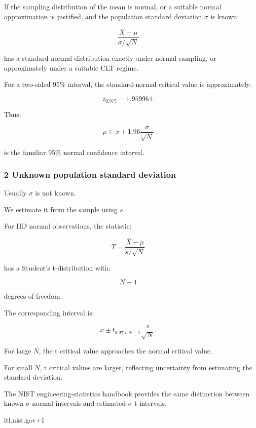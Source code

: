 \hypertarget{02-foundations-ii-ch030-known-population-standard-deviation}{}

If the sampling distribution of the mean is normal, or a suitable normal approximation is justified, and the population standard deviation \(\sigma\) is known:

\[
 \frac{\bar X-\mu}{\sigma/\sqrt N}
\]

has a standard-normal distribution exactly under normal sampling, or approximately under a suitable CLT regime.

For a two-sided 95\% interval, the standard-normal critical value is approximately:

\[
 z_{0.975}=1.959964.
\]

Thus:

\[
 \boxed{ \mu\in \bar x\pm1.96\frac{\sigma}{\sqrt N} }
\]

is the familiar 95\% normal confidence interval.

\subsubsection{2 Unknown population standard deviation}\label{02-foundations-ii-ch030-unknown-population-standard-deviation}

\hypertarget{02-foundations-ii-ch030-unknown-population-standard-deviation}{}

Usually \(\sigma\) is not known.

We estimate it from the sample using \(s\).

For IID normal observations, the statistic:

\[
 \boxed{ T= \frac{\bar X-\mu}{s/\sqrt N} }
\]

has a Student's t-distribution with:

\[
 N-1
\]

degrees of freedom.

The corresponding interval is:

\[
 \boxed{ \bar x \pm t_{0.975,N-1}\frac{s}{\sqrt N} }.
\]

For large \(N\), the t critical value approaches the normal critical value.

For small \(N\), t critical values are larger, reflecting uncertainty from estimating the standard deviation.

The NIST engineering-statistics handbook provides the same distinction between known-\(\sigma\) normal intervals and estimated-\(\sigma\) t intervals.

itl.nist.gov+1

